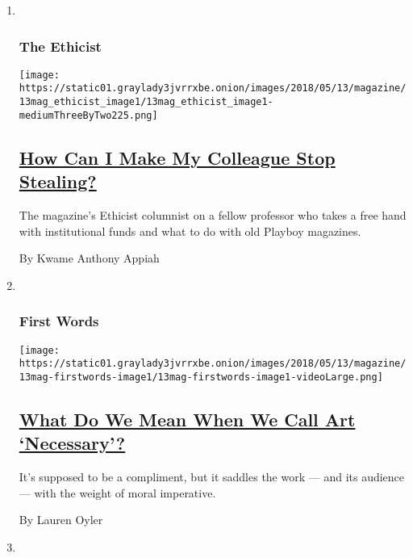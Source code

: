 \begin{enumerate}
\def\labelenumi{\arabic{enumi}.}
\item ~
  \hypertarget{the-ethicist}{%
  \subsubsection{The Ethicist}\label{the-ethicist}}

  \texttt{[image: https://static01.graylady3jvrrxbe.onion/images/2018/05/13/magazine/13mag\_ethicist\_image1/13mag\_ethicist\_image1-mediumThreeByTwo225.png]}

  \hypertarget{how-can-i-make-my-colleague-stop-stealing}{%
  \subsection{\texorpdfstring{\href{/2018/05/08/magazine/how-can-i-make-my-colleague-stop-stealing.html}{How
  Can I Make My Colleague Stop
  Stealing?}}{How Can I Make My Colleague Stop Stealing?}}\label{how-can-i-make-my-colleague-stop-stealing}}

  The magazine's Ethicist columnist on a fellow professor who takes a
  free hand with institutional funds and what to do with old Playboy
  magazines.

  By Kwame Anthony Appiah
\item ~
  \hypertarget{first-words}{%
  \subsubsection{First Words}\label{first-words}}

  \texttt{[image: https://static01.graylady3jvrrxbe.onion/images/2018/05/13/magazine/13mag-firstwords-image1/13mag-firstwords-image1-videoLarge.png]}

  \hypertarget{what-do-we-mean-when-we-call-art-necessary}{%
  \subsection{\texorpdfstring{\href{/2018/05/08/magazine/what-do-we-mean-when-we-call-art-necessary.html}{What
  Do We Mean When We Call Art
  `Necessary'?}}{What Do We Mean When We Call Art `Necessary'?}}\label{what-do-we-mean-when-we-call-art-necessary}}

  It's supposed to be a compliment, but it saddles the work --- and its
  audience --- with the weight of moral imperative.

  By Lauren Oyler
\item ~
  \hypertarget{eat}{%
}
\end{enumerate}
